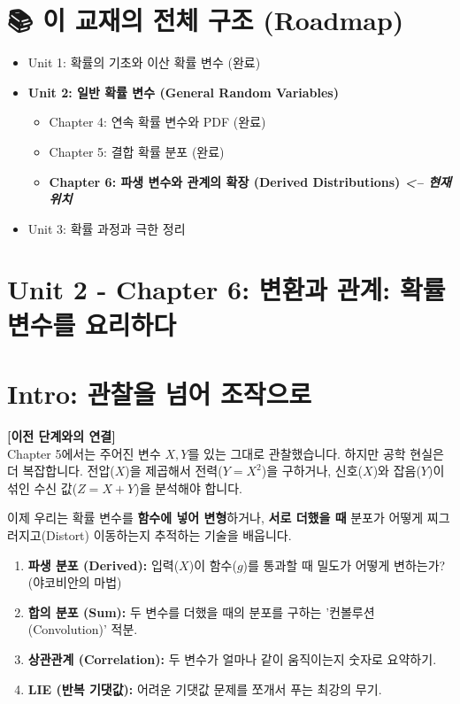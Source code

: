 \documentclass[11pt,a4paper]{book}
\newcommand{\chaptertitle}[2]{\section*{#1: #2}}
\theoremstyle{definition}
\begin{document}
\section*{📚 이 교재의 전체 구조 (Roadmap)}
\begin{itemize}
    \item Unit 1: 확률의 기초와 이산 확률 변수 (완료)
    \item \textbf{Unit 2: 일반 확률 변수 (General Random Variables)}
    \begin{itemize}
        \item Chapter 4: 연속 확률 변수와 PDF (완료)
        \item Chapter 5: 결합 확률 분포 (완료)
        \item[$\to$] \textbf{\textcolor{mainblue}{Chapter 6: 파생 변수와 관계의 확장 (Derived Distributions) \textit{<-- 현재 위치}}}
    \end{itemize}
    \item Unit 3: 확률 과정과 극한 정리
\end{itemize}
\vspace{1cm}

\chaptertitle{Unit 2 - Chapter 6}{변환과 관계: 확률 변수를 요리하다}

\section*{Intro: 관찰을 넘어 조작으로}

\textbf{[이전 단계와의 연결]} \\
Chapter 5에서는 주어진 변수 $X, Y$를 있는 그대로 관찰했습니다. 하지만 공학 현실은 더 복잡합니다. 전압($X$)을 제곱해서 전력($Y=X^2$)을 구하거나, 신호($X$)와 잡음($Y$)이 섞인 수신 값($Z=X+Y$)을 분석해야 합니다.

이제 우리는 확률 변수를 \textbf{함수에 넣어 변형}하거나, \textbf{서로 더했을 때} 분포가 어떻게 찌그러지고(Distort) 이동하는지 추적하는 기술을 배웁니다.

\begin{tcolorbox}[colback=subgray, title={\textbf{📌 이 단원의 핵심 개요 (Overview)}}]
\begin{enumerate}
    \item \textbf{파생 분포 (Derived):} 입력($X$)이 함수($g$)를 통과할 때 밀도가 어떻게 변하는가? (야코비안의 마법)
    \item \textbf{합의 분포 (Sum):} 두 변수를 더했을 때의 분포를 구하는 '컨볼루션(Convolution)' 적분.
    \item \textbf{상관관계 (Correlation):} 두 변수가 얼마나 같이 움직이는지 숫자로 요약하기.
    \item \textbf{LIE (반복 기댓값):} 어려운 기댓값 문제를 쪼개서 푸는 최강의 무기.
\end{enumerate}
\end{tcolorbox}
\end{document}

